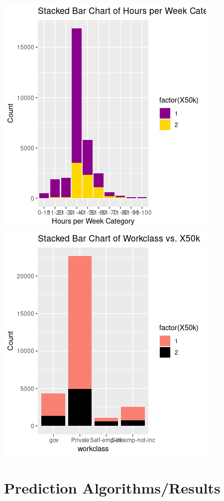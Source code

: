 \documentclass{article}
\begin{document}
\begin{center}
    \includegraphics[scale = 0.6]{hpw_barplot.png} \includegraphics[scale = 0.6]{workclass_barplot.png}
\end{center}
    
\section{Prediction Algorithms/Results}
\end{document}

